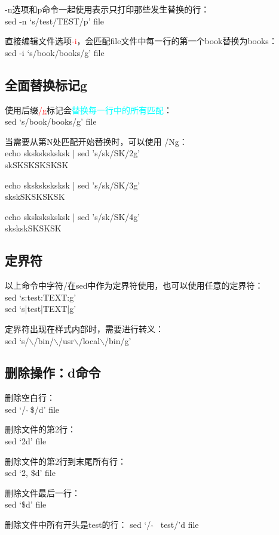\documentclass[12pt,a4paper]{article}
\begin{document}
-n选项和p命令一起使用表示只打印那些发生替换的行：\\
sed -n `s/test/TEST/p' file

直接编辑文件选项\textcolor{red}{-i}，会匹配file文件中每一行的第一个book替换为books：\\
sed -i `s/book/books/g' file

\subsection{全面替换标记g}
使用后缀\textcolor{red}{/g}标记会\textcolor{cyan}{替换每一行中的所有匹配}：\\
sed `s/book/books/g' file 

当需要从第N处匹配开始替换时，可以使用 /Ng：\\
echo sksksksksksk | sed 's/sk/SK/2g' \\
skSKSKSKSKSK 

echo sksksksksksk | sed 's/sk/SK/3g' \\
skskSKSKSKSK 

echo sksksksksksk | sed 's/sk/SK/4g' \\
skskskSKSKSK

\subsection{定界符}
以上命令中字符/在sed中作为定界符使用，也可以使用任意的定界符：\\
sed `s:test:TEXT:g' \\
sed `s|test|TEXT|g' 

定界符出现在样式内部时，需要进行转义：\\
sed `s/$\backslash$/bin/$\backslash$/usr$\backslash$/local$\backslash$/bin/g'


\subsection{删除操作：d命令}
删除空白行：\\
sed `/ $\hat{}~ \$$/d' file 

删除文件的第2行：\\
sed `2d' file 

删除文件的第2行到末尾所有行：\\
sed `2, $\$$d' file

删除文件最后一行：\\
sed `$\$$d' file 

删除文件中所有开头是test的行：
sed `/ $\hat{}$~ test/'d file
\end{document}
